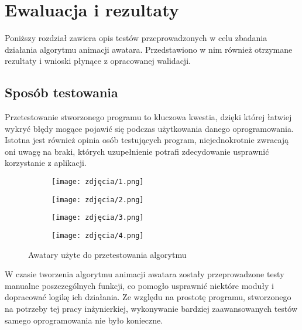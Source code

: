 \chapter{Ewaluacja i rezultaty}
\label{cha:ewaluacjaIRezultaty}
Poniższy rozdział zawiera opis testów przeprowadzonych w celu zbadania działania algorytmu animacji awatara. Przedstawiono w nim również otrzymane rezultaty i wnioski płynące z opracowanej walidacji.


\section{Sposób testowania}
Przetestowanie stworzonego programu to kluczowa kwestia, dzięki której łatwiej wykryć błędy mogące pojawić się podczas użytkowania danego oprogramowania. Istotna jest również opinia osób testujących program, niejednokrotnie zwracają oni uwagę na braki, których uzupełnienie potrafi zdecydowanie usprawnić korzystanie z aplikacji.

\begin{figure}[h]
	\centering
	\begin{subfigure}{0.35\textwidth}
		\centering
		\texttt{[image: zdjęcia/1.png]}
		\subcaption{\label{avatar_1}}
	\end{subfigure}
	\begin{subfigure}{0.35\textwidth}
		\centering
		\texttt{[image: zdjęcia/2.png]}
		\subcaption{\label{avatar_2}}
	\end{subfigure}
	\begin{subfigure}{0.35\textwidth}
		\centering
		\texttt{[image: zdjęcia/3.png]}
		\subcaption{\label{avatar_3}}
	\end{subfigure}
	\begin{subfigure}{0.35\textwidth}
		\centering
		\texttt{[image: zdjęcia/4.png]}
		\subcaption{\label{avatar_4}}
	\end{subfigure}
	
	\caption{\label{fig:avatars}Awatary użyte do przetestowania algorytmu}
\end{figure}

W czasie tworzenia algorytmu animacji awatara zostały przeprowadzone testy manualne poszczególnych funkcji, co pomogło usprawnić niektóre moduły i dopracować logikę ich działania. Ze względu na prostotę programu, stworzonego na potrzeby tej pracy inżynierkiej, wykonywanie bardziej zaawansowanych testów samego oprogramowania nie było konieczne.

